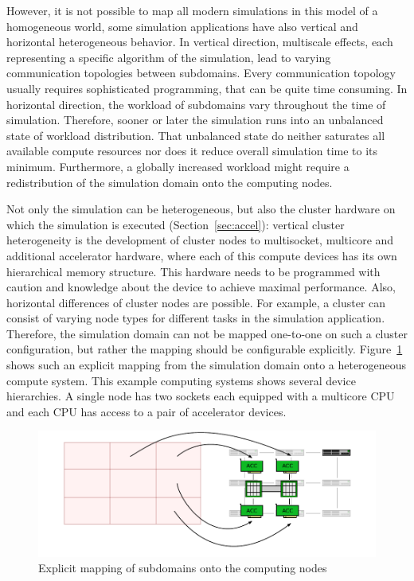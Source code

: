 However, it is not possible to map all modern simulations in this
model of a homogeneous world, some simulation applications have also
vertical and horizontal heterogeneous behavior.  In vertical
direction, multiscale effects, each representing a specific algorithm
of the simulation, lead to varying communication topologies between
subdomains. Every communication topology usually requires
sophisticated programming, that can be quite time consuming.  In
horizontal direction, the workload of subdomains vary throughout the
time of simulation. Therefore, sooner or later the simulation runs
into an unbalanced state of workload distribution. That unbalanced
state do neither saturates all available compute resources nor does it
reduce overall simulation time to its minimum. Furthermore, a globally
increased workload might require a redistribution of the simulation
domain onto the computing nodes.

Not only the simulation can be heterogeneous, but also the cluster
hardware on which the simulation is executed
(Section~\ref{sec:accel}): vertical cluster heterogeneity is the
development of cluster nodes to multisocket, multicore and
additional accelerator hardware, where each of this compute devices
has its own hierarchical memory structure. This hardware needs to be
programmed with caution and knowledge about the device to achieve
maximal performance.  Also, horizontal differences of cluster nodes
are possible. For example, a cluster can consist of varying node
types for different tasks in the simulation application. Therefore,
the simulation domain can not be mapped one-to-one on such a cluster
configuration, but rather the mapping should be configurable
explicitly. Figure~\ref{fig:heterogeneous_cluster_node} shows such
an explicit mapping from the simulation domain onto a heterogeneous
compute system. This example computing systems shows several device
hierarchies. A single node has two sockets each equipped with a
multicore CPU and each CPU has access to a pair of accelerator
devices.

\begin{figure}[H]
  \centering
  \includegraphics[width=\textwidth]{graphics/30_heterogeneous_cluster_node}
  \caption{Explicit mapping of subdomains onto the computing nodes}
  \label{fig:heterogeneous_cluster_node}
\end{figure}

